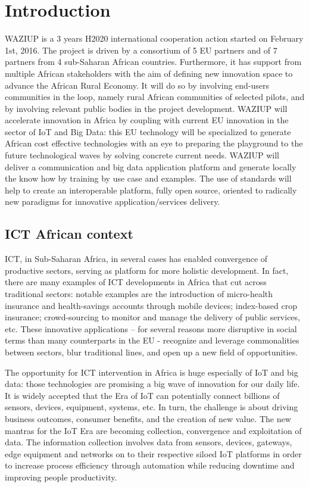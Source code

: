 
\section{Introduction}

WAZIUP is a 3 years H2020 international cooperation action started on February 1st, 2016.
The project is driven by a consortium of 5 EU partners and of 7 partners from 4 sub-Saharan African countries.
Furthermore, it has support from multiple African stakeholders with the aim of defining new innovation space to advance the African Rural Economy.
It will do so by involving end-users communities in the loop, namely rural African communities of selected pilots, and by involving relevant public bodies in the project development.
WAZIUP will accelerate innovation in Africa by coupling with current EU innovation in the sector of IoT and Big Data: this EU technology will be specialized to generate African cost effective technologies with an eye to preparing the playground to the future technological waves by solving concrete current needs.
WAZIUP will deliver a communication and big data application platform and generate locally the know how by training by use case and examples.
The use of standards will help to create an interoperable platform, fully open source, oriented to radically new paradigms for innovative application/services delivery.


\subsection{ICT African context}

ICT, in Sub-Saharan Africa, in several cases has enabled convergence of productive sectors, serving as platform for more holistic development.
In fact, there are many examples of ICT developments in Africa that cut across traditional sectors: notable examples are the introduction of micro-health insurance and health-savings accounts through mobile devices; index-based crop insurance; crowd-sourcing to monitor and manage the delivery of public services, etc.
These innovative applications – for several reasons more disruptive in social terms than many counterparts in the EU - recognize and leverage commonalities between sectors, blur traditional lines, and open up a new field of opportunities.

The opportunity for ICT intervention in Africa is huge especially of IoT and big data: those technologies are promising a big wave of innovation for our daily life.
It is widely accepted that the Era of IoT can potentially connect billions of sensors, devices, equipment, systems, etc.
In turn, the challenge is about driving business outcomes, consumer benefits, and the creation of new value.
The new mantras for the IoT Era are becoming collection, convergence and exploitation of data.
The information collection involves data from sensors, devices, gateways, edge equipment and networks on to their respective siloed IoT platforms in order to increase process efficiency through automation while reducing downtime and improving people productivity.

